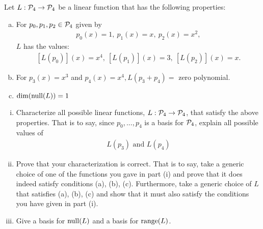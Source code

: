\begin{question}
    \normalfont
    Let $L:\P_4\rightarrow\P_4$ be a linear function that has the following properties:
    \begin{enumerate}[(a)]
        \item For $p_0,p_1,p_2\in\P_4$ given by 
        \[
            \begin{aligned}
                p_0(x)=1,\ p_1(x)=x,\ p_2(x)=x^2,
            \end{aligned}
        \]
        $L$ has the values: 
        \[
            \begin{aligned}
                [L(p_0)](x)=x^4,\ [L(p_1)](x)=3,\ [L(p_2)](x)=x.
            \end{aligned}
        \]
        \item For $p_3(x)=x^3$ and $p_4(x)=x^4,L(p_3+p_4)=$ zero polynomial.
        \item $\dim(\nullla(L))=1$
    \end{enumerate}
    \begin{enumerate}[(i)]
        \item Characterize all possible linear functions, $L:\P_4\rightarrow\P_4$, that satisfy the above properties. That is to say, since ${p_0,...,p_4}$ is a basis for $\P_4$, explain all possible values of 
        \[
            \begin{aligned}
                L(p_3)\text{  and  }L(p_4)
            \end{aligned}
        \]
        \item Prove that your characterization is correct. That is to say, take a generic choice of one of the functions you gave in part (i) and prove that it does indeed satisfy conditions (a), (b), (c). Furthermore, take a generic choice of $L$ that satisfies (a), (b), (c) and show that it must also satisfy the conditions you have given in part (i).
        \item Give a basis for $\nullla(L)$ and a basis for $\range(L)$.
    \end{enumerate}
\end{question}

